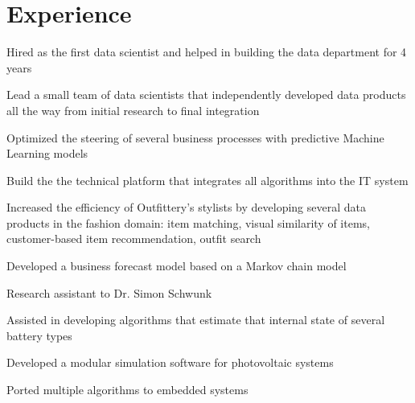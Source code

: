 \documentclass[]{deedy-resume-openfont}
\begin{document}
\begin{minipage}[t]{0.62\textwidth} 


\section{Experience}

\vspace{12pt} %
\begin{tightemize}
\item Hired as the first data scientist and helped in building the data department for 4 years
\item Lead a small team of data scientists that independently developed data products all the way from initial research to final integration
\item Optimized the steering of several business processes with predictive Machine Learning models
\item Build the the technical platform that integrates all algorithms into the IT system
\item Increased the efficiency of Outfittery's stylists by developing several data products in the fashion domain: item matching, visual similarity of items, customer-based item recommendation, outfit search
\item Developed a business forecast model based on a Markov chain model
\end{tightemize}
\sectionsep


\begin{tightemize}
\item Research assistant to Dr. Simon Schwunk
\item Assisted in developing algorithms that estimate that internal state of several battery types
\item Developed a modular simulation software for photovoltaic systems
\item Ported multiple algorithms to embedded systems
\end{tightemize}
\sectionsep



\end{minipage}
\end{document}

